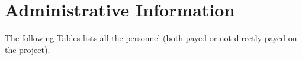 \section{Administrative Information}

The following Tables lists all the personnel (both payed or not directly payed 
on the project).

